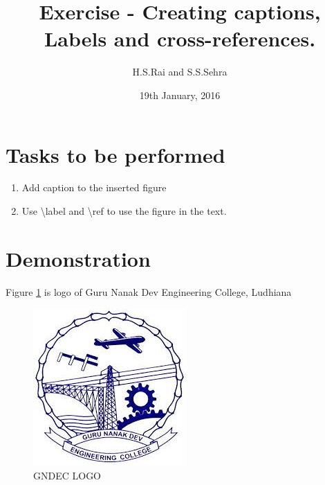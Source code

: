 \documentclass{article}
\title{Exercise - Creating captions, Labels and cross-references.}
\author{H.S.Rai and S.S.Sehra}
\date{19th January, 2016}
\begin{document}
	\maketitle	
	\section*{Tasks to be performed}
	\begin{enumerate}	
		\item Add caption to the inserted figure
		\item Use \textbackslash label and \textbackslash ref to use the figure in the text.
	\end{enumerate}
	\section*{Demonstration}
	 Figure \ref{fig:gnelogo} is logo of Guru Nanak Dev Engineering College, Ludhiana
\begin{figure}[h]
	\centering
\includegraphics{../../images/gnelogo}
\caption{GNDEC LOGO}
\label{fig:gnelogo}
\end{figure}
\end{document}
